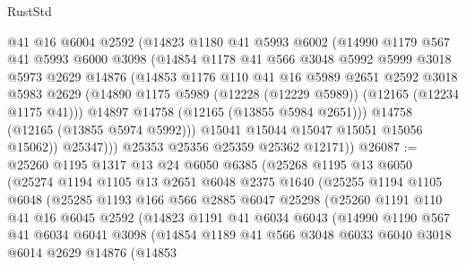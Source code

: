\begin{lexlean}{RustStd}
\begin{coremodule}
              @41
              @16
              @6004
              @2592
              (@14823
                @1180
                @41
                @5993
                @6002
                (@14990
                  @1179
                  @567
                  @41
                  @5993
                  @6000
                  @3098
                  (@14854
                    @1178
                    @41
                    @566
                    @3048
                    @5992
                    @5999
                    @3018
                    @5973
                    @2629
                    @14876
                    (@14853
                      @1176
                      @110
                      @41
                      @16
                      @5989
                      @2651
                      @2592
                      @3018
                      @5983
                      @2629
                      (@14890 @1175 @5989 (@12228 (@12229 @5989)) (@12165 (@12234 @1175 @41)))
                      @14897
                      @14758
                      (@12165 (@13855 @5984 @2651)))
                    @14758
                    (@12165 (@13855 @5974 @5992)))
                  @15041
                  @15044
                  @15047
                  @15051
                  @15056
                  @15062))
              @25347)))
        @25353
        @25356
        @25359
        @25362
        @12171))
@26087 := @25260
    @1195
    @1317
    @13
    @24
    @6050
    @6385
    (@25268
      @1195
      @13
      @6050
      (@25274
        @1194
        @1105
        @13
        @2651
        @6048
        @2375
        @1640
        (@25255
          @1194
          @1105
          @6048
          (@25285
            @1193
            @166
            @566
            @2885
            @6047
            @25298
            (@25260
              @1191
              @110
              @41
              @16
              @6045
              @2592
              (@14823
                @1191
                @41
                @6034
                @6043
                (@14990
                  @1190
                  @567
                  @41
                  @6034
                  @6041
                  @3098
                  (@14854
                    @1189
                    @41
                    @566
                    @3048
                    @6033
                    @6040
                    @3018
                    @6014
                    @2629
                    @14876
                    (@14853

\end{coremodule}
\end{lexlean}
